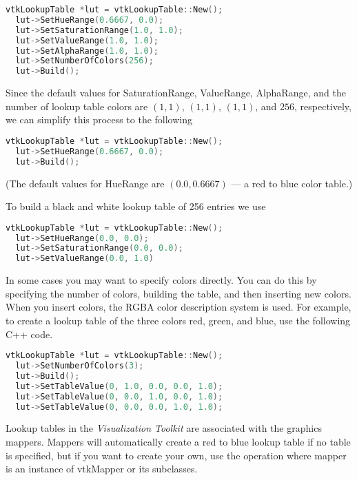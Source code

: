 \begin{lstlisting}[language=C++, caption={Create a rainbow lookup table.}]
vtkLookupTable *lut = vtkLookupTable::New();
  lut->SetHueRange(0.6667, 0.0);
  lut->SetSaturationRange(1.0, 1.0);
  lut->SetValueRange(1.0, 1.0);
  lut->SetAlphaRange(1.0, 1.0);
  lut->SetNumberOfColors(256);
  lut->Build();
\end{lstlisting}

Since the default values for SaturationRange, ValueRange, AlphaRange, and the number of lookup table colors are $(1,1)$, $(1,1)$, $(1,1)$, and $256$, respectively, we can simplify this process to the following

\begin{lstlisting}[language=C++, caption={Create a rainbow lookup table (simplified).}]
vtkLookupTable *lut = vtkLookupTable::New();
  lut->SetHueRange(0.6667, 0.0);
  lut->Build();
\end{lstlisting}

(The default values for HueRange are $(0.0, 0.6667)$ --- a red to blue color table.)

To build a black and white lookup table of 256 entries we use

\begin{lstlisting}[language=C++, caption={Create a black and white lookup table.}]
vtkLookupTable *lut = vtkLookupTable::New();
  lut->SetHueRange(0.0, 0.0);
  lut->SetSaturationRange(0.0, 0.0);
  lut->SetValueRange(0.0, 1.0)
\end{lstlisting}

In some cases you may want to specify colors directly. You can do this by specifying the number of colors, building the table, and then inserting new colors. When you insert colors, the RGBA color description system is used. For example, to create a lookup table of the three colors red, green, and blue, use the following C++ code.

\begin{lstlisting}[language=C++, caption={Directly specifying colors.}]
vtkLookupTable *lut = vtkLookupTable::New();
  lut->SetNumberOfColors(3);
  lut->Build();
  lut->SetTableValue(0, 1.0, 0.0, 0.0, 1.0);
  lut->SetTableValue(0, 0.0, 1.0, 0.0, 1.0);
  lut->SetTableValue(0, 0.0, 0.0, 1.0, 1.0);
\end{lstlisting}

Lookup tables in the \emph{Visualization Toolkit} are associated with the graphics mappers. Mappers will automatically create a red to blue lookup table if no table is specified, but if you want to create your own, use the  operation where mapper is an instance of vtkMapper or its subclasses.

